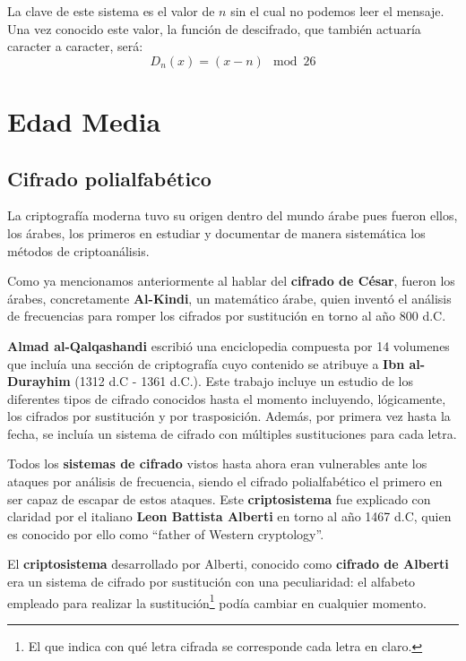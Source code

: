 \documentclass[nochap]{apuntesURJC}
\begin{document}
La clave de este sistema es el valor de $n$ sin el cual no podemos leer el mensaje. Una vez conocido este valor, la función de descifrado, que también actuaría caracter a caracter, será:
\[D_n(x)=(x-n) \mod 26\]

\section{Edad Media}

\subsection{Cifrado polialfabético}
La criptografía moderna tuvo su origen dentro del mundo árabe pues fueron ellos, los árabes, los primeros en estudiar y documentar de manera sistemática los métodos de criptoanálisis.

Como ya mencionamos anteriormente al hablar del \textbf{cifrado de César}, fueron los árabes, concretamente \textbf{Al-Kindi}, un matemático árabe, quien inventó el análisis de frecuencias para romper los cifrados por sustitución en torno al año 800 d.C.

\textbf{Almad al-Qalqashandi} escribió una enciclopedia compuesta por 14 volumenes que incluía una sección de criptografía cuyo contenido se atribuye a \textbf{Ibn al-Durayhim} (1312 d.C - 1361 d.C.). Este trabajo incluye un estudio de los diferentes tipos de cifrado conocidos hasta el momento incluyendo, lógicamente, los cifrados por sustitución y por trasposición. Además, por primera vez hasta la fecha, se incluía un sistema de cifrado con múltiples sustituciones para cada letra.

Todos los \textbf{sistemas de cifrado} vistos hasta ahora eran vulnerables ante los ataques por análisis de frecuencia, siendo el cifrado polialfabético el primero en ser capaz de escapar de estos ataques. Este \textbf{criptosistema} fue explicado con claridad por el italiano \textbf{Leon Battista Alberti} en torno al año 1467 d.C, quien es conocido por ello como ``father of Western cryptology''.

El \textbf{criptosistema} desarrollado por Alberti, conocido como \textbf{cifrado de Alberti} era un sistema de cifrado por sustitución con una peculiaridad: el alfabeto empleado para realizar la sustitución\footnote{El que indica con qué letra cifrada se corresponde cada letra en claro.} podía cambiar en cualquier momento.
\end{document}
